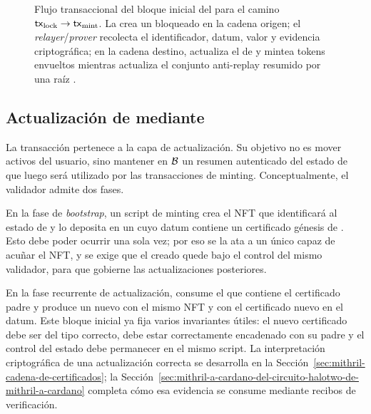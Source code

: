 \begin{figure}[!t]
  \shorthandon{>}
  \caption{Flujo transaccional del bloque inicial del \zkBridge para el camino $\mathsf{tx}_{\mathrm{lock}} \rightarrow \mathsf{tx}_{\mathrm{mint}}$. La \LockTx crea un \UTxO bloqueado en la cadena origen; el \textit{relayer}/\textit{prover} recolecta el identificador, datum, valor y evidencia criptográfica; en la cadena destino, \StakeDistTx actualiza el \UTxO de \StakeDistribution y \MintTx mintea tokens envueltos mientras actualiza el conjunto anti-replay resumido por una raíz \SMT.}
  \label{fig:chapter6-transaction-flow}
\end{figure}

\subsection{Actualización de \StakeDistribution mediante \texorpdfstring{\StakeDistTx}{tx\_sd}}
\label{subsec:validadores-y-flujo-transaccional-actualizacion-de-stakedistribution-mediante-tx-sd}

La transacción \StakeDistTx pertenece a la capa de actualización. Su objetivo no es mover activos del usuario, sino mantener en $\mathcal{B}$ un resumen autenticado del estado de \Mithril que luego será utilizado por las transacciones de minting. Conceptualmente, el validador admite dos fases.

En la fase de \textit{bootstrap}, un script de minting crea el NFT que identificará al estado de \StakeDistribution y lo deposita en un \UTxO cuyo datum contiene un certificado génesis de \Mithril. Esto debe poder ocurrir una sola vez; por eso se la ata a un único \UTxO capaz de acuñar el NFT, y se exige que el \UTxO creado quede bajo el control del mismo validador, para que gobierne las actualizaciones posteriores.

En la fase recurrente de actualización, \StakeDistTx consume el \UTxO que contiene el certificado padre y produce un nuevo \UTxO con el mismo NFT y con el certificado nuevo en el datum. Este bloque inicial ya fija varios invariantes útiles: el nuevo certificado debe ser del tipo correcto, debe estar correctamente encadenado con su padre y el control del estado debe permanecer en el mismo script. La interpretación criptográfica de una actualización correcta se desarrolla en la Sección~\ref{sec:mithril-cadena-de-certificados}; la Sección~\ref{sec:mithril-a-cardano-del-circuito-halotwo-de-mithril-a-cardano} completa cómo esa evidencia se consume mediante recibos de verificación.

